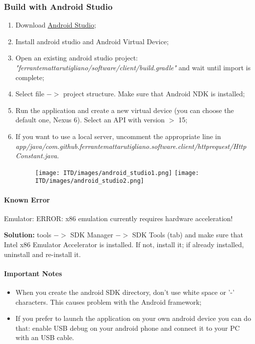 \documentclass[a4paper]{article}
\begin{document}
\subsubsection{Build with Android Studio}
\begin{enumerate}
    \item Download \href{https://developer.android.com/studio/}{\underline{Android Studio}};
    \item Install android studio and Android Virtual Device;
    \item Open an existing android studio project:
    \newline\textit{"ferrantemattarutigliano/software/client/build.gradle"} and wait until import is complete;
    \item Select file ${->}$ project structure. Make sure that Android NDK is installed;
    \item Run the application and create a new virtual device (you can choose the default one, Nexus 6). Select an API with version ${>}$ 15;
    \item If you want to use a local server, uncomment the appropriate line in \textit{app/java/com.github.ferrantemattarutigliano.software.client/httprequest/HttpConstant.java}.
    \begin{figure}[!htpb]
    \centering
    \texttt{[image: ITD/images/android\_studio1.png]}
    \texttt{[image: ITD/images/android\_studio2.png]}
    \end{figure}
\end{enumerate}

\paragraph{Known Error}
Emulator: ERROR: x86 emulation currently requires hardware acceleration!

\textbf{Solution:} tools ${->}$ SDK Manager ${->}$ SDK Tools (tab) and make sure that Intel x86 Emulator Accelerator is installed. If not, install it; if already installed, uninstall and re-install it.

\paragraph{Important Notes}
\begin{itemize}
    \item When you create the android SDK directory, don't use white space or '-' characters. This causes problem with the Android framework;
    \item If you prefer to launch the application on your own android device you can do that: enable USB debug on your android phone and connect it to your PC with an USB cable.
\end{itemize}
\end{document}

